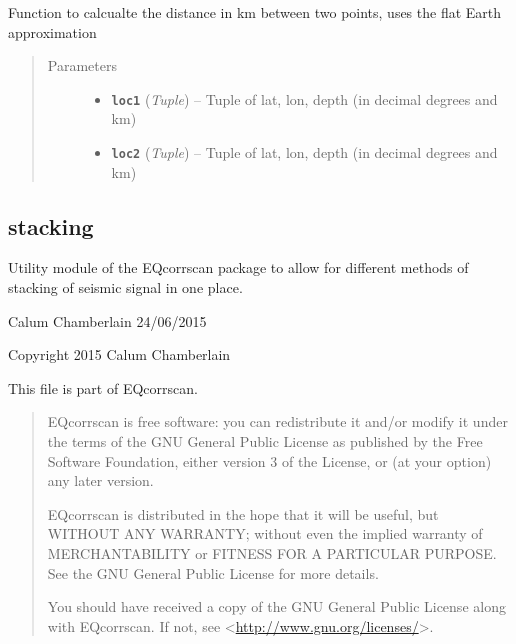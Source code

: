\documentclass[a4paper,10pt,english]{sphinxmanual}
\begin{document}
\begin{fulllineitems}
\label{submodules/utils.mag_calc:mag_calc.dist_calc}
Function to calcualte the distance in km between two points, uses the flat
Earth approximation
\begin{quote}\begin{description}
\item[{Parameters}] \leavevmode\begin{itemize}
\item {} 
\textbf{\texttt{loc1}} (\emph{Tuple}) -- Tuple of lat, lon, depth (in decimal degrees and km)

\item {} 
\textbf{\texttt{loc2}} (\emph{Tuple}) -- Tuple of lat, lon, depth (in decimal degrees and km)

\end{itemize}

\end{description}\end{quote}

\end{fulllineitems}



\subsection{stacking}
\label{submodules/utils.stacking:stacking}\label{submodules/utils.stacking:module-stacking}\label{submodules/utils.stacking::doc}
Utility module of the EQcorrscan package to allow for different methods of
stacking of seismic signal in one place.

Calum Chamberlain 24/06/2015

Copyright 2015 Calum Chamberlain

This file is part of EQcorrscan.
\begin{quote}

EQcorrscan is free software: you can redistribute it and/or modify
it under the terms of the GNU General Public License as published by
the Free Software Foundation, either version 3 of the License, or
(at your option) any later version.

EQcorrscan is distributed in the hope that it will be useful,
but WITHOUT ANY WARRANTY; without even the implied warranty of
MERCHANTABILITY or FITNESS FOR A PARTICULAR PURPOSE.  See the
GNU General Public License for more details.

You should have received a copy of the GNU General Public License
along with EQcorrscan.  If not, see \textless{}\href{http://www.gnu.org/licenses/}{http://www.gnu.org/licenses/}\textgreater{}.
\end{quote}
\end{document}
